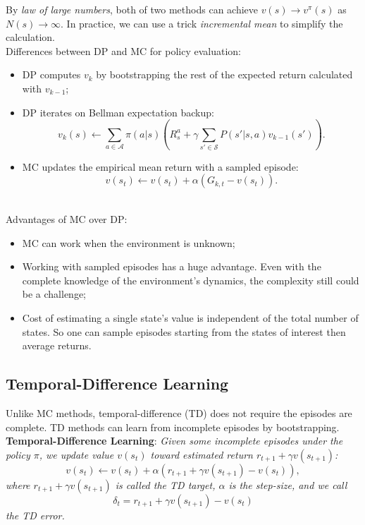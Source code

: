 \documentclass{progartcn}
\begin{document}
		By \textit{law of large numbers}, both of two methods can achieve $v(s)\to v^\pi(s)$ as $N(s)\to\infty$. In practice, we can use a trick \textit{incremental mean} to simplify the calculation.\\

		Differences between DP and MC for policy evaluation:
		\begin{itemize}[noitemsep,topsep=0pt]
		\item DP computes $v_k$ by bootstrapping the rest of the expected return calculated with $v_{k−1}$;
		\item DP iterates on Bellman expectation backup:
		\[v_k(s)\gets\sum_{a\in \mathcal{A}}\pi(a|s)\left(R_s^a+\gamma\sum_{s'\in \mathcal{S}}P(s'|s,a)v_{k-1}(s')\right).\]
		\item MC updates the empirical mean return with a sampled episode:
		\[v(s_t)\gets v(s_t)+\alpha(G_{k,t} - v(s_t)).\]\
		\end{itemize}

		Advantages of MC over DP:
		\begin{itemize}[noitemsep,topsep=0pt]
		\item MC can work when the environment is unknown;
		\item Working with sampled episodes has a huge advantage. Even with the complete knowledge of the environment's dynamics, the complexity still could be a challenge;
		\item Cost of estimating a single state's value is independent of the total number of states. So one can sample episodes starting from the states of interest then average returns.\\
		\end{itemize}

	\subsection{Temporal-Difference Learning}

		Unlike MC methods, temporal-difference (TD) does not require the episodes are complete. TD methods can learn from incomplete episodes by bootstrapping.\\

		\textbf{Temporal-Difference Learning}: \textit{Given some incomplete episodes under the policy $\pi$, we update value $v(s_t)$ toward estimated return $r_{t+1}+\gamma v(s_{t+1})$:}
		\[v(s_t)\gets v(s_t)+\alpha(r_{t+1}+\gamma v(s_{t+1})-v(s_t)),\]
		\textit{where $r_{t+1}+\gamma v(s_{t+1})$ is called the TD target, $\alpha$ is the step-size, and we call}
		\[\delta_t=r_{t+1}+\gamma v(s_{t+1})-v(s_t)\]
		\textit{the TD error.\\}
\end{document}
